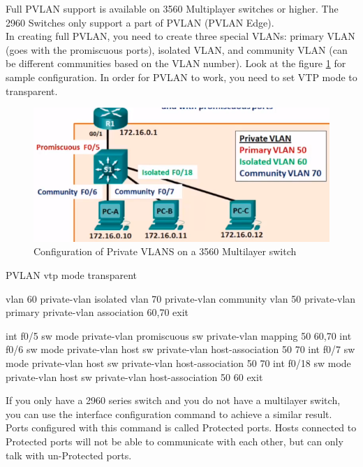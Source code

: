 Full PVLAN support is available on 3560 Multiplayer switches or higher. The 2960 Switches only support a part of PVLAN (PVLAN Edge). \\

In creating full PVLAN, you need to create three special VLANs: primary VLAN (goes with the promiscuous ports), isolated VLAN, and community VLAN (can be different communities based on the VLAN number). Look at the figure \ref{PVLANconfig} for sample configuration. In order for PVLAN to work, you need to set VTP mode to transparent. 

\begin{figure}[hbtp]
\caption{Configuration of Private VLANS on a 3560 Multilayer switch}\label{PVLANconfig}
\centering
\includegraphics[scale=0.5]{pictures/PVLANconfig.PNG}
\end{figure}

\begin{sexylisting}{PVLAN}
vtp mode transparent

vlan 60
private-vlan isolated
vlan 70
private-vlan community
vlan 50
private-vlan primary
private-vlan association 60,70
exit

int f0/5
sw mode private-vlan promiscuous
sw private-vlan mapping 50 60,70
int f0/6
sw mode private-vlan host
sw private-vlan host-association 50 70
int f0/7
sw mode private-vlan host
sw private-vlan host-association 50 70
int f0/18
sw mode private-vlan host
sw private-vlan host-association 50 60
exit
\end{sexylisting}

If you only have a 2960 series switch and you do not have a multilayer switch, you can use the  interface configuration command to achieve a similar result. Ports configured with this command is called Protected ports. Hosts connected to Protected ports will not be able to communicate with each other, but can only talk with un-Protected ports. 

